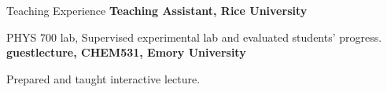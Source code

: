 \begin{rubric}{Teaching Experience}
%
\entry*[\hspace{1.05cm}2015]%
  \textbf{Teaching Assistant, Rice University}
  \par PHYS 700 lab, Supervised experimental lab and evaluated students' progress.
\entry*[\hspace{1.05cm}2021]%
  \textbf{guestlecture, CHEM531, Emory University}
  \par Prepared and taught interactive lecture.
\end{rubric}
